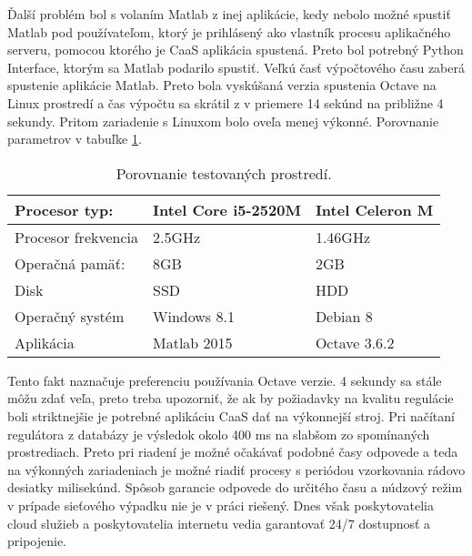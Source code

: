 \indent Ďalší problém bol s volaním Matlab z inej aplikácie, kedy nebolo možné spustiť Matlab pod používateľom, ktorý je prihlásený ako vlastník procesu aplikačného serveru, pomocou ktorého je CaaS aplikácia spustená. Preto bol potrebný Python Interface, ktorým sa Matlab podarilo spustiť. Veľkú časť výpočtového času zaberá spustenie aplikácie Matlab. Preto bola vyskúšaná verzia spustenia Octave na Linux prostredí a čas výpočtu sa skrátil z v priemere 14 sekúnd na približne 4 sekundy. Pritom zariadenie s Linuxom bolo oveľa menej výkonné. Porovnanie parametrov v tabuľke  \ref{table:2}.
\begin{table}[h!]
\centering
 \caption{Porovnanie testovaných prostredí.}
 \begin{tabular}{ |p{4cm}|p{5.5cm}p{5.5cm}| } 
 \hline
 Procesor typ: & Intel Core i5-2520M & Intel Celeron M \\ 
  \hline
 Procesor frekvencia &  2.5GHz  & 1.46GHz   \\ 
 \hline
 Operačná pamäť: & 8GB & 2GB  \\ 
 \hline
 Disk & SSD & HDD \\
 \hline
 Operačný systém & Windows 8.1 & Debian 8 \\ 
 \hline
 Aplikácia & Matlab 2015 & Octave 3.6.2 \\  
 \hline
\end{tabular}
\label{table:2}
\end{table}
Tento fakt naznačuje preferenciu používania Octave verzie. 4 sekundy sa stále môžu zdať veľa, preto treba upozorniť, že ak by požiadavky na kvalitu regulácie boli striktnejšie je potrebné aplikáciu CaaS dať na výkonnejší stroj. Pri  načítaní regulátora z databázy je výsledok okolo 400 ms na slabšom zo spomínaných prostrediach. Preto pri riadení je možné očakávať podobné časy odpovede a teda na výkonných zariadeniach je možné riadiť procesy s periódou vzorkovania rádovo desiatky milisekúnd. Spôsob garancie odpovede do určitého času a núdzový režim v prípade sieťového výpadku nie je v práci riešený. Dnes však poskytovatelia cloud služieb a poskytovatelia internetu vedia garantovať 24/7 dostupnosť a pripojenie.


